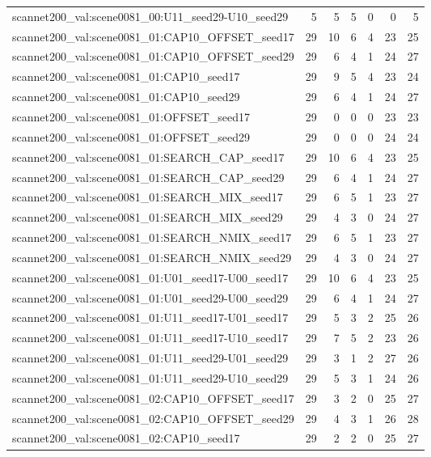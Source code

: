 \begin{table}[t]
\begin{tabular}{lrrrrrr}
scannet200\_val:scene0081\_00:U11\_seed29-U10\_seed29 & 5 & 5 & 5 & 0 & 0 & 5 \\
scannet200\_val:scene0081\_01:CAP10\_OFFSET\_seed17 & 29 & 10 & 6 & 4 & 23 & 25 \\
scannet200\_val:scene0081\_01:CAP10\_OFFSET\_seed29 & 29 & 6 & 4 & 1 & 24 & 27 \\
scannet200\_val:scene0081\_01:CAP10\_seed17 & 29 & 9 & 5 & 4 & 23 & 24 \\
scannet200\_val:scene0081\_01:CAP10\_seed29 & 29 & 6 & 4 & 1 & 24 & 27 \\
scannet200\_val:scene0081\_01:OFFSET\_seed17 & 29 & 0 & 0 & 0 & 23 & 23 \\
scannet200\_val:scene0081\_01:OFFSET\_seed29 & 29 & 0 & 0 & 0 & 24 & 24 \\
scannet200\_val:scene0081\_01:SEARCH\_CAP\_seed17 & 29 & 10 & 6 & 4 & 23 & 25 \\
scannet200\_val:scene0081\_01:SEARCH\_CAP\_seed29 & 29 & 6 & 4 & 1 & 24 & 27 \\
scannet200\_val:scene0081\_01:SEARCH\_MIX\_seed17 & 29 & 6 & 5 & 1 & 23 & 27 \\
scannet200\_val:scene0081\_01:SEARCH\_MIX\_seed29 & 29 & 4 & 3 & 0 & 24 & 27 \\
scannet200\_val:scene0081\_01:SEARCH\_NMIX\_seed17 & 29 & 6 & 5 & 1 & 23 & 27 \\
scannet200\_val:scene0081\_01:SEARCH\_NMIX\_seed29 & 29 & 4 & 3 & 0 & 24 & 27 \\
scannet200\_val:scene0081\_01:U01\_seed17-U00\_seed17 & 29 & 10 & 6 & 4 & 23 & 25 \\
scannet200\_val:scene0081\_01:U01\_seed29-U00\_seed29 & 29 & 6 & 4 & 1 & 24 & 27 \\
scannet200\_val:scene0081\_01:U11\_seed17-U01\_seed17 & 29 & 5 & 3 & 2 & 25 & 26 \\
scannet200\_val:scene0081\_01:U11\_seed17-U10\_seed17 & 29 & 7 & 5 & 2 & 23 & 26 \\
scannet200\_val:scene0081\_01:U11\_seed29-U01\_seed29 & 29 & 3 & 1 & 2 & 27 & 26 \\
scannet200\_val:scene0081\_01:U11\_seed29-U10\_seed29 & 29 & 5 & 3 & 1 & 24 & 26 \\
scannet200\_val:scene0081\_02:CAP10\_OFFSET\_seed17 & 29 & 3 & 2 & 0 & 25 & 27 \\
scannet200\_val:scene0081\_02:CAP10\_OFFSET\_seed29 & 29 & 4 & 3 & 1 & 26 & 28 \\
scannet200\_val:scene0081\_02:CAP10\_seed17 & 29 & 2 & 2 & 0 & 25 & 27 \\

\end{tabular}
\end{table}
